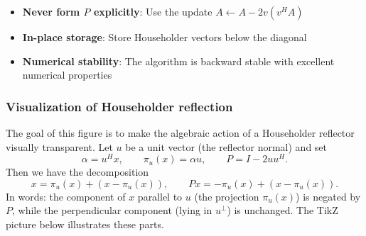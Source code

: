 \begin{itemize}
    \item \textbf{Never form $P$ explicitly}: Use the update $A \leftarrow A - 2v(v^H A)$
    \item \textbf{In-place storage}: Store Householder vectors below the diagonal
    \item \textbf{Numerical stability}: The algorithm is backward stable with excellent numerical properties
\end{itemize}

\subsubsection{Visualization of Householder reflection}
The goal of this figure is to make the algebraic action of a Householder reflector visually transparent. Let $u$ be a unit vector (the reflector normal) and set
\[
    \alpha = u^H x, \qquad \pi_u(x)=\alpha u, \qquad P = I - 2 uu^H.
\]
Then we have the decomposition
\[
    x = \pi_u(x) + (x-\pi_u(x)), \qquad P x = -\pi_u(x) + (x-\pi_u(x)).
\]
In words: the component of $x$ parallel to $u$ (the projection $\pi_u(x)$) is negated by $P$, while the perpendicular component (lying in $u^\perp$) is unchanged. The TikZ picture below illustrates these parts.

